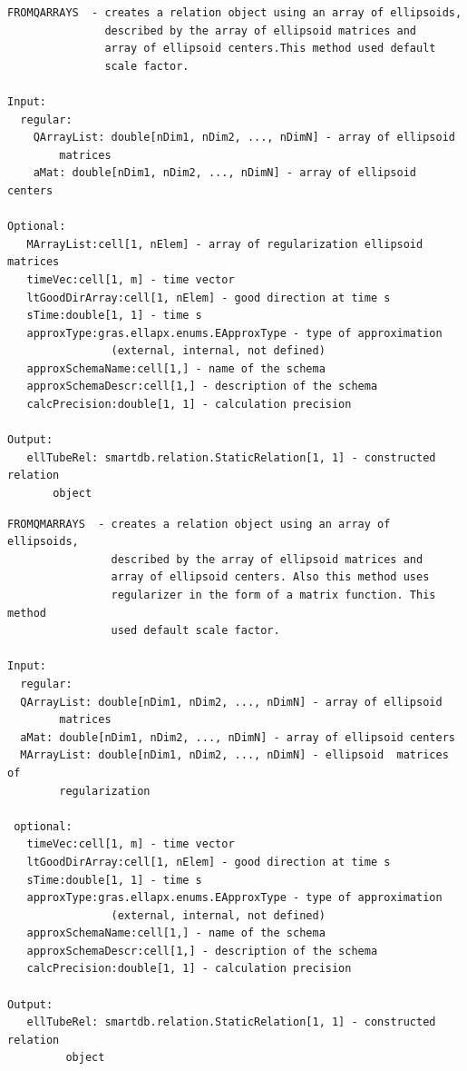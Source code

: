 \documentclass[letterpaper,10pt,english]{sphinxmanual}
\begin{document}
\begin{Verbatim}[commandchars=\\\{\}]
FROMQARRAYS  - creates a relation object using an array of ellipsoids,
               described by the array of ellipsoid matrices and
               array of ellipsoid centers.This method used default
               scale factor.

Input:
  regular:
    QArrayList: double[nDim1, nDim2, ..., nDimN] - array of ellipsoid
        matrices
    aMat: double[nDim1, nDim2, ..., nDimN] - array of ellipsoid centers

Optional:
   MArrayList:cell[1, nElem] - array of regularization ellipsoid matrices
   timeVec:cell[1, m] - time vector
   ltGoodDirArray:cell[1, nElem] - good direction at time s
   sTime:double[1, 1] - time s
   approxType:gras.ellapx.enums.EApproxType - type of approximation
                (external, internal, not defined)
   approxSchemaName:cell[1,] - name of the schema
   approxSchemaDescr:cell[1,] - description of the schema
   calcPrecision:double[1, 1] - calculation precision

Output:
   ellTubeRel: smartdb.relation.StaticRelation[1, 1] - constructed relation
       object
\end{Verbatim}

\begin{Verbatim}[commandchars=\\\{\}]
FROMQMARRAYS  - creates a relation object using an array of ellipsoids,
                described by the array of ellipsoid matrices and
                array of ellipsoid centers. Also this method uses
                regularizer in the form of a matrix function. This method
                used default scale factor.

Input:
  regular:
  QArrayList: double[nDim1, nDim2, ..., nDimN] - array of ellipsoid
        matrices
  aMat: double[nDim1, nDim2, ..., nDimN] - array of ellipsoid centers
  MArrayList: double[nDim1, nDim2, ..., nDimN] - ellipsoid  matrices of
        regularization

 optional:
   timeVec:cell[1, m] - time vector
   ltGoodDirArray:cell[1, nElem] - good direction at time s
   sTime:double[1, 1] - time s
   approxType:gras.ellapx.enums.EApproxType - type of approximation
                (external, internal, not defined)
   approxSchemaName:cell[1,] - name of the schema
   approxSchemaDescr:cell[1,] - description of the schema
   calcPrecision:double[1, 1] - calculation precision

Output:
   ellTubeRel: smartdb.relation.StaticRelation[1, 1] - constructed relation
         object
\end{Verbatim}
\end{document}
